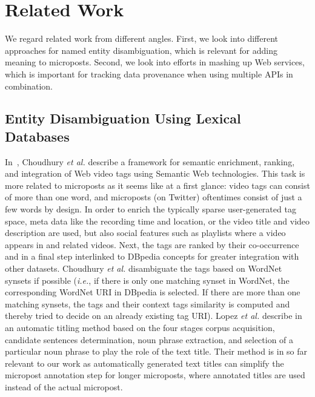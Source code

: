 \documentclass[twocolumn]{article}
\begin{document}
\section{Related Work}\label{sec:related}
We regard related work from different angles. First, we look into different approaches for named entity disambiguation, which is relevant for adding meaning to microposts.
Second, we look into efforts in mashing up Web services, which is important for tracking data provenance when using multiple APIs in combination.

\subsection{Entity Disambiguation Using Lexical Databases}
In~\cite{Choudhury:YouTube}, Choudhury \emph{et al.} describe a framework for semantic enrichment, ranking, and integration of
Web video tags using Semantic Web technologies. This task is more related to microposts as it seems like at a first glance: video tags can consist of more than one word, and microposts (on Twitter) oftentimes consist of just a few words by design. In order to enrich the typically sparse user-generated tag space, meta
data like the recording time and location, or the video title and video description are used, but also social features
such as playlists where a video appears in and related videos. Next, the tags are ranked by their co-occurrence and in
a final step interlinked to DBpedia concepts for greater integration with other
datasets. Choudhury \emph{et al.} disambiguate the tags based on WordNet~\cite{Princeton:WordNet} synsets if possible (\emph{i.e.}, if
there is only one matching synset in WordNet, the corresponding WordNet URI in DBpedia is selected. If there are more
than one matching synsets, the tags and their context tags similarity is computed and thereby tried to decide on an
already existing tag URI).
Lopez \emph{et al.} describe in~\cite{Lopez} an automatic titling method based on the four stages corpus 
acquisition, candidate sentences determination, noun 
phrase extraction, and selection of a particular noun phrase to play the role of the text title. Their method is in so far relevant to our work as automatically generated text titles can simplify the micropost annotation step for longer microposts, where annotated titles are used instead of the actual micropost.
\end{document}
